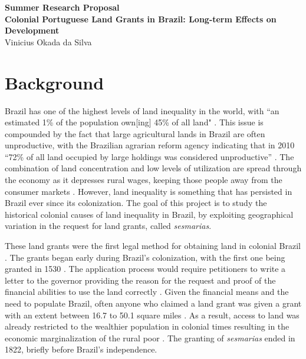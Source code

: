 \documentclass[11pt]{article}
\begin{document}
\begin{center}
\large \textbf{Summer Research Proposal}
\\
\vspace{3mm}
\large{\textbf{Colonial Portuguese Land Grants in Brazil: Long-term Effects on Development}}
\\
\vspace{3mm}
\smallskip
\normalsize{Vinicius Okada da Silva}
\end{center}

\vspace{-5mm}

\section{Background}

Brazil has one of the highest levels of land inequality in the world, with ``an estimated 1\% of the population own[ing] 45\% of all land" \parencite{Usaid2016-xs}. 
This issue is compounded by the fact that large agricultural lands in Brazil are often unproductive, with the Brazilian agrarian reform agency indicating that in 2010 ``72\% of all land occupied by large holdings was considered unproductive'' \parencite{Carlson2019-mk}.
The combination of land concentration and low levels of utilization are spread through the economy as it depresses rural wages, keeping those people away from the consumer markets \parencite[p.~1]{De_Oliveira_Andrade1980-xz}.
However, land inequality is something that has persisted in Brazil ever since its colonization.
The goal of this project is to study the historical colonial causes of land inequality in Brazil, by exploiting geographical variation in the request for land grants, called \textit{sesmarias}.

These land grants were the first legal method for obtaining land in colonial Brazil \parencite{Smith1944-oi}.
The grants began early during Brazil's colonization, with the first one being granted in 1530 \parencite[p.~16]{Diegues_Junior1959-ba}. 
The application process would require petitioners to write a letter to the governor providing the reason for the request and proof of the financial abilities to use the land correctly \parencite{Smith1944-oi}.
Given the financial means and the need to populate Brazil, often anyone who claimed a land grant was given a grant with an extent between 16.7 to 50.1 square miles \parencite{Dean1971-iq}.
As a result, access to land was already restricted to the wealthier population in colonial times resulting in the economic marginalization of the rural poor \parencites{Lobb1976-mc}[p.~23-24]{Panini1990-rj}.
The granting of \textit{sesmarias} ended in 1822, briefly before Brazil's independence.
\end{document}
